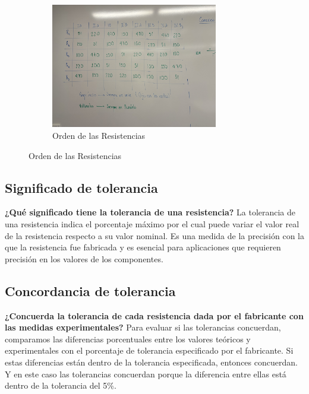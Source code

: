 \begin{figure}[H]
    \centering
    \begin{subfigure}[b]{\textwidth}
        \centering
        \includegraphics[width=0.8\textwidth]{Figures/1. Content/OrdenResistencias.jpg}
        \caption{Orden de las Resistencias}
        \label{fig: Orden de las Resistencias}
    \end{subfigure}
    \hfill
\end{figure}

\subsection{Significado de tolerancia}
\textbf{¿Qué significado tiene la tolerancia de una resistencia?}
La tolerancia de una resistencia indica el porcentaje máximo por el cual puede variar el valor real de la resistencia respecto a su valor nominal. Es una medida de la precisión con la que la resistencia fue fabricada y es esencial para aplicaciones que requieren precisión en los valores de los componentes.

\subsection{Concordancia de tolerancia}
\textbf{¿Concuerda la tolerancia de cada resistencia dada por el fabricante con las medidas experimentales?}
Para evaluar si las tolerancias concuerdan, comparamos las diferencias porcentuales entre los valores teóricos y experimentales con el porcentaje de tolerancia especificado por el fabricante. Si estas diferencias están dentro de la tolerancia especificada, entonces concuerdan.
Y en este caso las tolerancias concuerdan porque la diferencia entre ellas está dentro de la tolerancia del 5\%.


